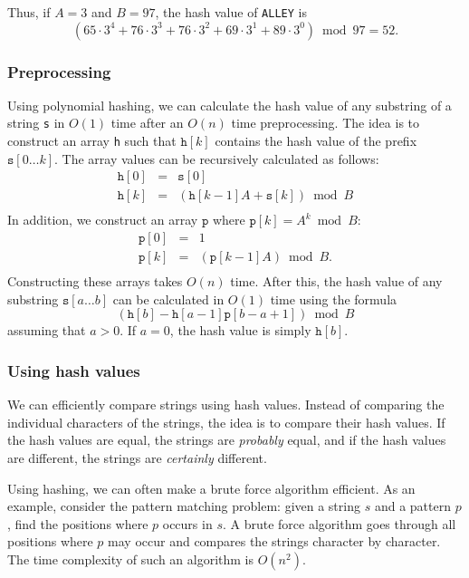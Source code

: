 Thus, if $A=3$ and $B=97$, the hash value
of \texttt{ALLEY} is
\[(65 \cdot 3^4 + 76 \cdot 3^3 + 76 \cdot 3^2 + 69 \cdot 3^1 + 89 \cdot 3^0) \bmod 97 = 52.\]

\subsubsection*{Preprocessing}

Using polynomial hashing, we can calculate the hash value of any substring
of a string \texttt{s} in $O(1)$ time after an $O(n)$ time preprocessing.
The idea is to construct an array \texttt{h} such that
$\texttt{h}[k]$ contains the hash value of the prefix $\texttt{s}[0 \ldots k]$.
The array values can be recursively calculated as follows:
\[
\begin{array}{lcl}
\texttt{h}[0] & = & \texttt{s}[0] \\
\texttt{h}[k] & = & (\texttt{h}[k-1] A + \texttt{s}[k]) \bmod B \\
\end{array}
\]
In addition, we construct an array $\texttt{p}$
where $\texttt{p}[k]=A^k \bmod B$:
\[
\begin{array}{lcl}
\texttt{p}[0] & = & 1 \\
\texttt{p}[k] & = & (\texttt{p}[k-1] A) \bmod B. \\
\end{array}
\]
Constructing these arrays takes $O(n)$ time.
After this, the hash value of any substring
$\texttt{s}[a \ldots b]$
can be calculated in $O(1)$ time using the formula
\[(\texttt{h}[b]-\texttt{h}[a-1] \texttt{p}[b-a+1]) \bmod B\]
assuming that $a>0$.
If $a=0$, the hash value is simply $\texttt{h}[b]$.

\subsubsection*{Using hash values}

We can efficiently compare strings using hash values.
Instead of comparing the individual characters of the strings,
the idea is to compare their hash values.
If the hash values are equal,
the strings are \emph{probably} equal,
and if the hash values are different,
the strings are \emph{certainly} different.

Using hashing, we can often make a brute force
algorithm efficient.
As an example, consider the pattern matching problem:
given a string $s$ and a pattern $p$,
find the positions where $p$ occurs in $s$.
A brute force algorithm goes through all positions
where $p$ may occur and compares the strings
character by character.
The time complexity of such an algorithm is $O(n^2)$.

